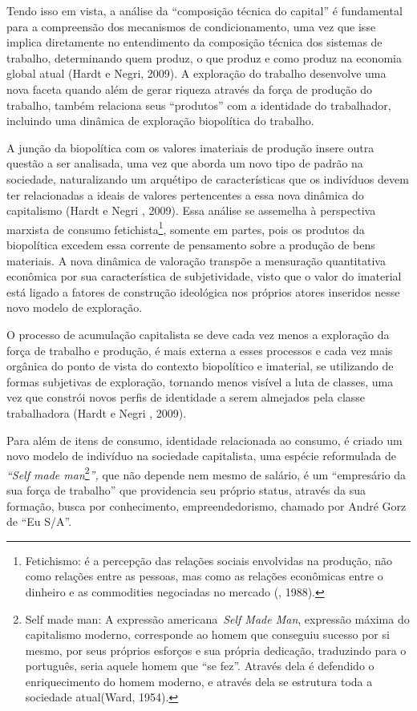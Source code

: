 Tendo isso em vista, a análise da ``composição técnica do capital'' é
fundamental para a compreensão dos mecanismos de condicionamento, uma
vez que isse implica diretamente no entendimento da composição técnica
dos sistemas de trabalho, determinando quem produz, o que produz e como
produz na economia global atual (Hardt e Negri, 2009). A exploração do
trabalho desenvolve uma nova faceta quando além de gerar riqueza através
da força de produção do trabalho, também relaciona seus ``produtos'' com
a identidade do trabalhador, incluindo uma dinâmica de exploração
biopolítica do trabalho.

A junção da biopolítica com os valores imateriais de produção insere
outra questão a ser analisada, uma vez que aborda um novo tipo de padrão
na sociedade, naturalizando um arquétipo de características que os
indivíduos devem ter relacionadas a ideais de valores pertencentes a
essa nova dinâmica do capitalismo (Hardt e Negri , 2009). Essa análise
se assemelha à perspectiva marxista de consumo fetichista\footnote{Fetichismo:
  é a percepção das relações sociais envolvidas na produção, não como
  relações entre as pessoas, mas como as relações econômicas entre o
  dinheiro e as commodities negociadas no mercado (, 1988).},
somente em partes, pois os produtos da biopolítica excedem essa corrente
de pensamento sobre a produção de bens materiais. A nova dinâmica de
valoração transpõe a mensuração quantitativa econômica por sua
característica de subjetividade, visto que o valor do imaterial está
ligado a fatores de construção ideológica nos próprios atores inseridos
nesse novo modelo de exploração.

O processo de acumulação capitalista se deve cada vez menos a exploração
da força de trabalho e produção, é mais externa a esses processos e cada
vez mais orgânica do ponto de vista do contexto biopolítico e imaterial,
se utilizando de formas subjetivas de exploração, tornando menos visível
a luta de classes, uma vez que constrói novos perfis de identidade a
serem almejados pela classe trabalhadora (Hardt e Negri , 2009).

Para além de itens de consumo, identidade relacionada ao consumo, é
criado um novo modelo de indivíduo na sociedade capitalista, uma espécie
reformulada de \emph{``Self made man}\footnote{Self made man: A
  expressão americana~\emph{Self Made Man}, expressão máxima do
  capitalismo moderno, corresponde ao homem que conseguiu sucesso por si
  mesmo, por seus próprios esforços e sua própria dedicação, traduzindo
  para o português, seria aquele homem que ``se fez''. Através dela é
  defendido o enriquecimento do homem moderno, e através dela se
  estrutura toda a sociedade atual(Ward, 1954).}\emph{'',} que não
depende nem mesmo de salário, é um ``empresário da sua força de
trabalho'' que providencia seu próprio status, através da sua formação,
busca por conhecimento, empreendedorismo, chamado por André Gorz de ``Eu
S/A''.

